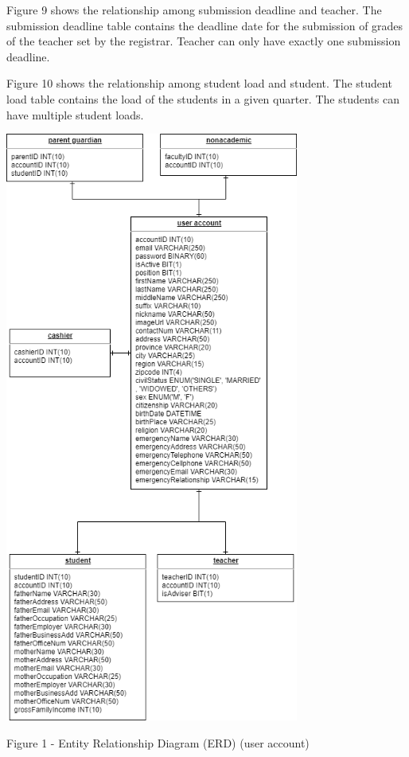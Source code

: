 \documentclass[11pt,a4paper,titlepage]{article}
\begin{document}
Figure 9 shows the relationship among submission deadline and teacher. The submission deadline table contains the deadline date for the submission of grades of the teacher set by the registrar. Teacher can only have exactly one submission deadline.

Figure 10 shows the relationship among student load and student. The student load table contains the load of the students in a given quarter. The students can have multiple student loads.

\vspace{1cm}
\newpage
\begin{center}
    \includegraphics[height=19.5cm]{User.png}
\end{center}
\vspace{1cm}
\begin{center}
    Figure 1 - Entity Relationship Diagram (ERD) (user account)
\end{center}
\end{document}
